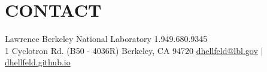 \vspace{-15pt}
\section{\small{CONTACT}}

Lawrence Berkeley National Laboratory \hfill 1.949.680.9345\\
1 Cyclotron Rd. (B50 - 4036R) Berkeley, CA 94720 \hfill \href{mailto:dhellfeld@lbl.gov}{dhellfeld@lbl.gov} $|$ \href{https://dhellfeld.github.io}{dhellfeld.github.io}

